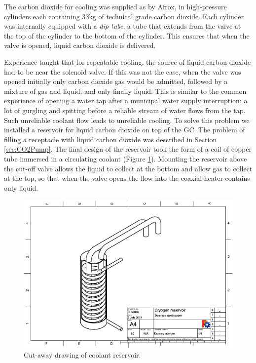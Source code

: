 The carbon dioxide for cooling was supplied as by Afrox, in high-pressure
cylinders each containing 33kg of technical grade carbon dioxide. Each cylinder
was internally equipped with a \textit{dip tube}, a tube that extends from the
valve at the top of the cylinder to the bottom of the cylinder. This ensures
that when the valve is opened, liquid carbon dioxide is delivered.

Experience taught that for repeatable cooling, the source of liquid carbon
dioxide had to be near the solenoid valve. If this was not the case, when the
valve was opened initially only carbon dioxide gas would be admitted, followed
by a mixture of gas and liquid, and only finally liquid. This is similar to the
common experience of opening a water tap after a municipal water supply
interruption: a lot of gurgling and spitting before a reliable stream of water
flows from the tap. Such unreliable coolant flow leads to unreliable cooling. To
solve this problem we installed a reservoir for liquid carbon dioxide on top of
the GC. The problem of filling a receptacle with liquid carbon dioxide was
described in Section \ref{sec:CO2Pump}. The final design of the reservoir took
the form of a coil of copper tube immersed in a circulating coolant (Figure
\ref{fig:CryogenReservoir}). Mounting the reservoir above the cut-off valve
allows the liquid to collect at the bottom and allow gas to collect at the top,
so that when the valve opens the flow into the coaxial heater contains only
liquid.


\begin{figure}
	\centering
	\includegraphics[angle=90, origin=c, scale=0.75]{./Figures/CryogenReservoir.pdf}
	\decoRule
	\caption[Coolant reservoir]{Cut-away drawing of coolant reservoir.}	
	\label{fig:CryogenReservoir}
\end{figure}


